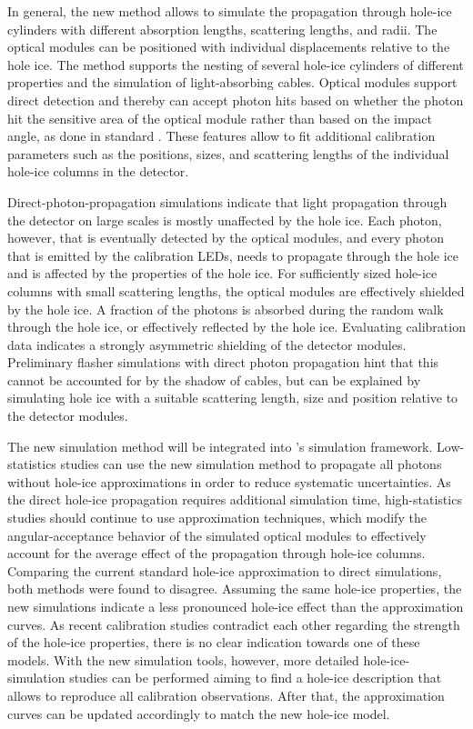 In general, the new method allows to simulate the propagation through hole-ice cylinders with different absorption lengths, scattering lengths, and radii.
The optical modules can be positioned with individual displacements relative to the hole ice.
The method supports the nesting of several hole-ice cylinders of different properties and the simulation of light-absorbing cables.
Optical modules support direct detection and thereby can accept photon hits based on whether the photon hit the sensitive area of the optical module rather than based on the impact angle, as done in standard \clsim.
These features allow to fit additional calibration parameters such as the positions, sizes, and scattering lengths of the individual hole-ice columns in the \icecube detector.

Direct-photon-propagation simulations indicate that light propagation through the \icecube detector on large scales is mostly unaffected by the hole ice. Each photon, however, that is eventually detected by the optical modules, and every photon that is emitted by the calibration LEDs, needs to propagate through the hole ice and is affected by the properties of the hole ice.
For sufficiently sized hole-ice columns with small scattering lengths, the optical modules are effectively shielded by the hole ice. A fraction of the photons is absorbed during the random walk through the hole ice, or effectively reflected by the hole ice.
Evaluating calibration data indicates a strongly asymmetric shielding of the detector modules. Preliminary flasher simulations with direct photon propagation hint that this cannot be accounted for by the shadow of cables, but can be explained by simulating hole ice with a suitable scattering length, size and position relative to the detector modules.

The new simulation method will be integrated into \icecube's simulation framework.
Low-statistics studies can use the new simulation method to propagate all photons without hole-ice approximations in order to reduce systematic uncertainties.
As the direct hole-ice propagation requires additional simulation time, high-statistics studies should continue to use approximation techniques, which modify the angular-acceptance behavior of the simulated optical modules to effectively account for the average effect of the propagation through hole-ice columns.
Comparing the current standard hole-ice approximation to direct simulations, both methods were found to disagree.
Assuming the same hole-ice properties, the new simulations indicate a less pronounced hole-ice effect than the approximation curves.
As recent calibration studies contradict each other regarding the strength of the hole-ice properties, there is no clear indication towards one of these models.
With the new simulation tools, however, more detailed hole-ice-simulation studies can be performed aiming to find a hole-ice description that allows to reproduce all calibration observations.
After that, the approximation curves can be updated accordingly to match the new hole-ice model.

